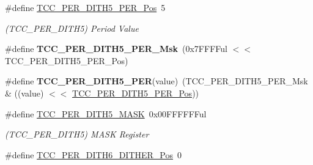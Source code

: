 \begin{DoxyCompactItemize}
\item 
\hypertarget{group___s_a_m_l21___t_c_c_gab905a71a85c84fce0a99c8c6505d6226}{}\#define \hyperlink{group___s_a_m_l21___t_c_c_gab905a71a85c84fce0a99c8c6505d6226}{T\+C\+C\+\_\+\+P\+E\+R\+\_\+\+D\+I\+T\+H5\+\_\+\+P\+E\+R\+\_\+\+Pos}~5\label{group___s_a_m_l21___t_c_c_gab905a71a85c84fce0a99c8c6505d6226}

\begin{DoxyCompactList}\small\item\em (T\+C\+C\+\_\+\+P\+E\+R\+\_\+\+D\+I\+T\+H5) Period Value \end{DoxyCompactList}\item 
\hypertarget{group___s_a_m_l21___t_c_c_gaf2fcc86f5b8a09341eb0f3b20ec4788a}{}\#define {\bfseries T\+C\+C\+\_\+\+P\+E\+R\+\_\+\+D\+I\+T\+H5\+\_\+\+P\+E\+R\+\_\+\+Msk}~(0x7\+F\+F\+F\+Ful $<$$<$ T\+C\+C\+\_\+\+P\+E\+R\+\_\+\+D\+I\+T\+H5\+\_\+\+P\+E\+R\+\_\+\+Pos)\label{group___s_a_m_l21___t_c_c_gaf2fcc86f5b8a09341eb0f3b20ec4788a}

\item 
\hypertarget{group___s_a_m_l21___t_c_c_gac0d603eecc3e2a39cda044e537ccd1fb}{}\#define {\bfseries T\+C\+C\+\_\+\+P\+E\+R\+\_\+\+D\+I\+T\+H5\+\_\+\+P\+E\+R}(value)~(T\+C\+C\+\_\+\+P\+E\+R\+\_\+\+D\+I\+T\+H5\+\_\+\+P\+E\+R\+\_\+\+Msk \& ((value) $<$$<$ \hyperlink{group___s_a_m_l21___t_c_c_gab905a71a85c84fce0a99c8c6505d6226}{T\+C\+C\+\_\+\+P\+E\+R\+\_\+\+D\+I\+T\+H5\+\_\+\+P\+E\+R\+\_\+\+Pos}))\label{group___s_a_m_l21___t_c_c_gac0d603eecc3e2a39cda044e537ccd1fb}

\item 
\hypertarget{group___s_a_m_l21___t_c_c_ga6c47e370c73d764d06d2fd7dcb23b56b}{}\#define \hyperlink{group___s_a_m_l21___t_c_c_ga6c47e370c73d764d06d2fd7dcb23b56b}{T\+C\+C\+\_\+\+P\+E\+R\+\_\+\+D\+I\+T\+H5\+\_\+\+M\+A\+S\+K}~0x00\+F\+F\+F\+F\+F\+Ful\label{group___s_a_m_l21___t_c_c_ga6c47e370c73d764d06d2fd7dcb23b56b}

\begin{DoxyCompactList}\small\item\em (T\+C\+C\+\_\+\+P\+E\+R\+\_\+\+D\+I\+T\+H5) M\+A\+S\+K Register \end{DoxyCompactList}\item 
\hypertarget{group___s_a_m_l21___t_c_c_ga0aef363c030bf36a184597ebcd1e30df}{}\#define \hyperlink{group___s_a_m_l21___t_c_c_ga0aef363c030bf36a184597ebcd1e30df}{T\+C\+C\+\_\+\+P\+E\+R\+\_\+\+D\+I\+T\+H6\+\_\+\+D\+I\+T\+H\+E\+R\+\_\+\+Pos}~0\label{group___s_a_m_l21___t_c_c_ga0aef363c030bf36a184597ebcd1e30df}


\end{DoxyCompactItemize}
